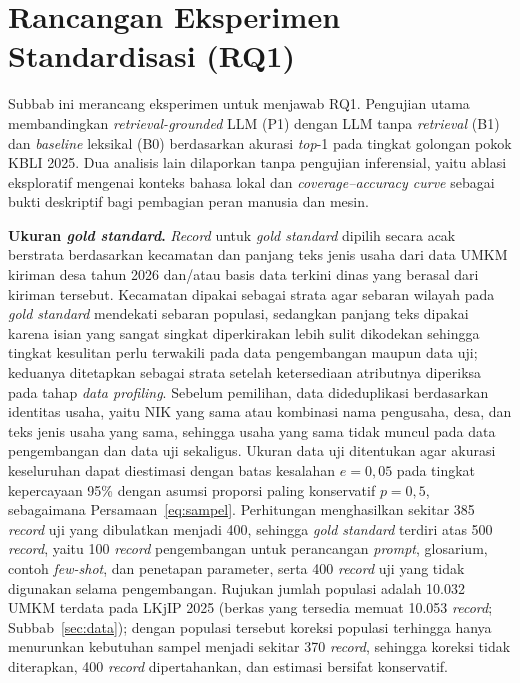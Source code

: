 \section{Rancangan Eksperimen Standardisasi (RQ1)}
\label{sec:eksperimen}

Subbab ini merancang eksperimen untuk menjawab RQ1. Pengujian utama membandingkan \textit{retrieval-grounded} LLM (P1) dengan LLM tanpa \textit{retrieval} (B1) dan \textit{baseline} leksikal (B0) berdasarkan akurasi \textit{top}-1 pada tingkat golongan pokok KBLI 2025. Dua analisis lain dilaporkan tanpa pengujian inferensial, yaitu ablasi eksploratif mengenai konteks bahasa lokal dan \textit{coverage--accuracy curve} sebagai bukti deskriptif bagi pembagian peran manusia dan mesin.

\textbf{Ukuran \textit{gold standard}.} \textit{Record} untuk \textit{gold standard} dipilih secara acak berstrata berdasarkan kecamatan dan panjang teks jenis usaha dari data UMKM kiriman desa tahun 2026 dan/atau basis data terkini dinas yang berasal dari kiriman tersebut. Kecamatan dipakai sebagai strata agar sebaran wilayah pada \textit{gold standard} mendekati sebaran populasi, sedangkan panjang teks dipakai karena isian yang sangat singkat diperkirakan lebih sulit dikodekan sehingga tingkat kesulitan perlu terwakili pada data pengembangan maupun data uji; keduanya ditetapkan sebagai strata setelah ketersediaan atributnya diperiksa pada tahap \textit{data profiling}. Sebelum pemilihan, data dideduplikasi berdasarkan identitas usaha, yaitu NIK yang sama atau kombinasi nama pengusaha, desa, dan teks jenis usaha yang sama, sehingga usaha yang sama tidak muncul pada data pengembangan dan data uji sekaligus. Ukuran data uji ditentukan agar akurasi keseluruhan dapat diestimasi dengan batas kesalahan $e = 0{,}05$ pada tingkat kepercayaan 95\% dengan asumsi proporsi paling konservatif $p = 0{,}5$, sebagaimana Persamaan~\eqref{eq:sampel}. Perhitungan menghasilkan sekitar 385 \textit{record} uji yang dibulatkan menjadi 400, sehingga \textit{gold standard} terdiri atas 500 \textit{record}, yaitu 100 \textit{record} pengembangan untuk perancangan \textit{prompt}, glosarium, contoh \textit{few-shot}, dan penetapan parameter, serta 400 \textit{record} uji yang tidak digunakan selama pengembangan. Rujukan jumlah populasi adalah 10.032 UMKM terdata pada LKjIP 2025 \cite[hlm.~50]{lkjip2025toba} (berkas yang tersedia memuat 10.053 \textit{record}; Subbab~\ref{sec:data}); dengan populasi tersebut koreksi populasi terhingga hanya menurunkan kebutuhan sampel menjadi sekitar 370 \textit{record}, sehingga koreksi tidak diterapkan, 400 \textit{record} dipertahankan, dan estimasi bersifat konservatif.

